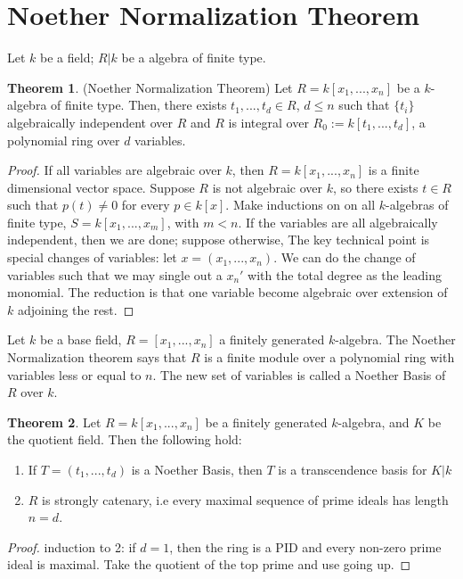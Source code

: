 \documentclass{article}
\theoremstyle{definition}
\newtheorem{theorem}{Theorem}[section]
\theoremstyle{definition}
\theoremstyle{definition}
\theoremstyle{definition}
\theoremstyle{definition}
\theoremstyle{definition}
\theoremstyle{definition}
\begin{document}
\section{Noether Normalization Theorem}
Let $k$ be a field; $R|k$ be a algebra of finite type. 


\begin{tcolorbox}[colback=red!5!white,colframe=red!30!white]
\begin{theorem}
(Noether Normalization Theorem) Let $R=k[x_1,...,x_n]$ be a $k$-algebra of finite type. Then, there exists $t_1,...,t_d\in R$, $d\leq n$ such that $\{t_i\}$ algebraically independent over $R$ and $R$ is integral over $R_0:=k[t_1,...,t_d]$, a polynomial ring over $d$ variables.  
\end{theorem}
\end{tcolorbox}
\begin{proof}
If all variables are algebraic over $k$, then $R=k[x_1,...,x_n]$ is a finite dimensional vector space. Suppose $R$ is not algebraic over $k$, so there exists $t\in R$ such that $p(t)\neq 0$ for every $p\in k[x]$. Make inductions on on all $k$-algebras of finite type, $S=k[x_1,...,x_m]$, with $m<n$. If the variables are all algebraically independent, then we are done; suppose otherwise, The key technical point is special changes of variables: let $x=(x_1,...,x_n)$. We can do the change of variables such that we may single out a $x_n'$ with the total degree as the leading monomial. The reduction is that one variable become algebraic over extension of $k$ adjoining the rest. 
\end{proof}

Let $k$ be a base field, $R=[x_1,...,x_n]$ a finitely generated $k$-algebra. The Noether Normalization theorem says that $R$ is a finite module over a polynomial ring with variables less or equal to $n$. The new set of variables is called a Noether Basis of $R$ over $k$. 



\begin{tcolorbox}[colback=red!5!white,colframe=red!30!white]
\begin{theorem}
Let $R=k[x_1,...,x_n]$ be a finitely generated $k$-algebra, and $K$ be the quotient field. Then the following hold:
\begin{enumerate}
    \item If $T=(t_1,...,t_d)$ is a Noether Basis, then $T$ is a transcendence basis for $K|k$
    \item $R$ is strongly catenary, i.e every maximal sequence of prime ideals has length $n=d$. 
\end{enumerate}
\end{theorem}
\end{tcolorbox}
\begin{proof}
    induction to 2: if $d=1$, then the ring is a PID and every non-zero prime ideal is maximal. Take the quotient of the top prime and use going up. 
\end{proof}
\end{document}
